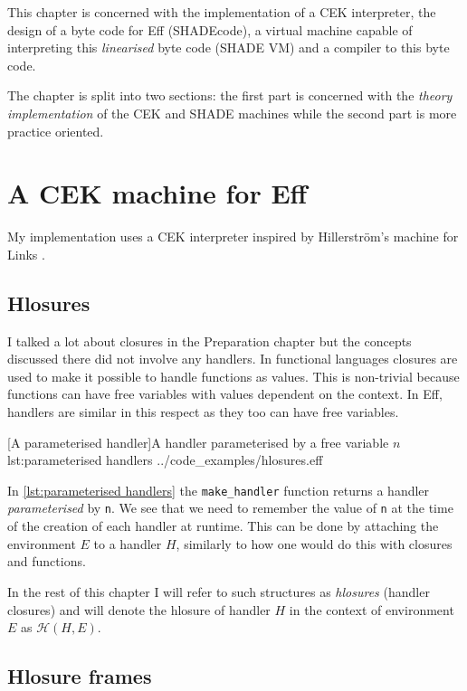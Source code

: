 \documentclass[class=article, crop=false]{standalone}
\begin{document}
This chapter is concerned with the implementation of a CEK interpreter, the
design of a byte code for Eff (SHADEcode), a virtual machine capable of
interpreting this \emph{linearised} byte code (SHADE VM) and a compiler to this byte
code.

The chapter is split into two sections: the first part is concerned with the
\emph{theory implementation} of the CEK and SHADE machines while the second part
is more practice oriented.

\section{A CEK machine for Eff}

My implementation uses a CEK interpreter inspired by Hillerström's
machine for Links \cite{hillerstrom2016compilation}.

\subsection{Hlosures}

I talked a lot about closures in the Preparation chapter but the concepts
discussed there did not involve any handlers. In functional languages closures
are used to make it possible to handle functions as values. This is non-trivial
because functions can have free variables with values 
dependent on the context. In Eff, handlers are similar in this respect
as they too can have free variables.

{[A parameterised handler]A handler parameterised by a free variable $n$}
{lst:parameterised handlers}
{../code_examples/hlosures.eff}

In \autoref{lst:parameterised handlers} the \lstinline|make_handler| function
returns a handler \emph{parameterised} by \lstinline|n|. We see that we need to
remember the value of \verb|n| at the time of the creation of each handler
at runtime. This can be done by attaching the environment $E$ to a handler $H$,
similarly to how one would do this with closures and functions.

In the rest of this chapter I will refer to such structures as \emph{hlosures}
(handler closures) and will denote the hlosure of handler $H$ in the context of
environment $E$ as $\mathcal{H}(H, E)$.

\subsection{Hlosure frames}
\end{document}
